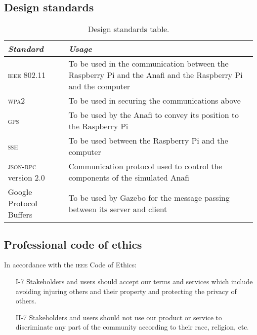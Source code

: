 \documentclass[../main.tex]{subfiles}
\begin{document}
\subsection{Design standards}

\begin{table}[H]
    \centering
    \caption{Design standards table.}
    \label{tab:design-standards}
    \begin{tabular}{ P{2.2cm} P{12.3cm} }
        \toprule
            \textit{Standard} 
                & \textit{Usage}\\

        \midrule
        \textsc{ieee} 802.11 
                & To be used in the communication between 
                the Raspberry Pi and the Anafi and the 
                Raspberry Pi and the computer \\ 
                \addlinespace
        
        \textsc{wpa}2 
                & To be used in securing the communications above \\
                \addlinespace
        
        
        \textsc{gps}  
                & To be used by the Anafi to convey its position 
                to the Raspberry Pi \\
                \addlinespace
        
        
        \textsc{ssh} 
                & To be used between the Raspberry Pi and the computer \\
                \addlinespace
        
        
        \textsc{json-rpc} version 2.0 
                & Communication protocol used to control the components 
                of the simulated Anafi \\
                \addlinespace
        
        
        Google Protocol Buffers 
                & To be used by Gazebo for the message passing between 
                its server and client \\
        
        \bottomrule
    \end{tabular}
\end{table}

\subsection{Professional code of ethics}

\noindent
In accordance with the \textsc{ieee} Code of Ethics:
\begin{itemize}
    \item[I-7] Stakeholders and users 
        should accept our terms and services which include 
        avoiding injuring others and their property 
        and protecting the privacy of others.
    \item[II-7] Stakeholders and users should not use our product 
        or service to discriminate any
        part of the community according 
        to their race, religion, etc.
\end{itemize}
\end{document}
